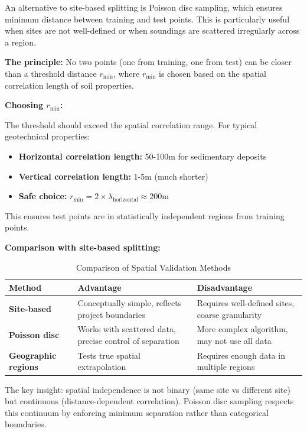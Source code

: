 \documentclass[12pt]{article}
\begin{document}
An alternative to site-based splitting is Poisson disc sampling, which ensures minimum distance between training and test points. This is particularly useful when sites are not well-defined or when soundings are scattered irregularly across a region.

\textbf{The principle:} No two points (one from training, one from test) can be closer than a threshold distance $r_{\text{min}}$, where $r_{\text{min}}$ is chosen based on the spatial correlation length of soil properties.

\textbf{Choosing $r_{\text{min}}$:}

The threshold should exceed the spatial correlation range. For typical geotechnical properties:

\begin{itemize}
	\item \textbf{Horizontal correlation length:} 50-100m for sedimentary deposits
	\item \textbf{Vertical correlation length:} 1-5m (much shorter)
	\item \textbf{Safe choice:} $r_{\text{min}} = 2 \times \lambda_{\text{horizontal}} \approx 200$m
\end{itemize}

This ensures test points are in statistically independent regions from training points.

\textbf{Comparison with site-based splitting:}

\begin{table}[h]
	\centering
	\caption{Comparison of Spatial Validation Methods}
	\label{tab:spatial_methods}
	\begin{tabular}{@{}p{3.5cm}p{5cm}p{5cm}@{}}
		\toprule
		\textbf{Method} & \textbf{Advantage} & \textbf{Disadvantage} \\
		\midrule
		\textbf{Site-based} & Conceptually simple, reflects project boundaries & Requires well-defined sites, coarse granularity \\
		\addlinespace
		\textbf{Poisson disc} & Works with scattered data, precise control of separation & More complex algorithm, may not use all data \\
		\addlinespace
		\textbf{Geographic regions} & Tests true spatial extrapolation & Requires enough data in multiple regions \\
		\bottomrule
	\end{tabular}
\end{table}

The key insight: spatial independence is not binary (same site vs different site) but continuous (distance-dependent correlation). Poisson disc sampling respects this continuum by enforcing minimum separation rather than categorical boundaries.
\end{document}
